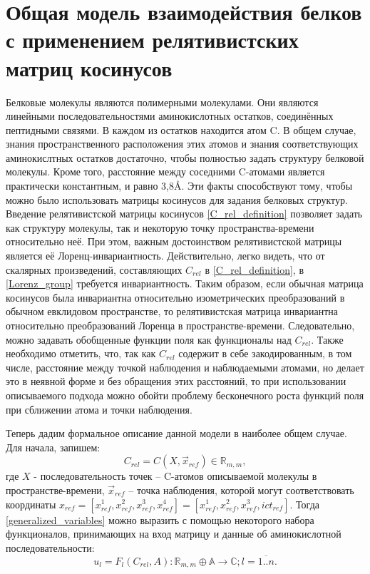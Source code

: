 \section{Общая модель взаимодействия белков с применением релятивистских матриц косинусов}
Белковые молекулы являются полимерными молекулами. Они являются линейными последовательностями аминокислотных остатков, соединённых пептидными связями. В каждом из остатков
находится атом C\textalpha. В общем случае, знания пространственного расположения этих атомов и знания соответствующих аминокислтных остатков достаточно, чтобы полностью задать структуру белковой молекулы.
Кроме того, расстояние между соседними C\textalpha-атомами является практически константным, и равно 3,8\AA. Эти факты способствуют тому, чтобы можно было использовать матрицы косинусов для задания белковых структур.
Введение релятивистской матрицы косинусов \ref{C_rel_definition} позволяет задать как структуру молекулы, так и некоторую точку пространства-времени относительно неё. При этом, важным достоинством релятивистской матрицы является её Лоренц-инвариантность. Действительно, легко видеть, что от скалярных произведений, составляющих $C_{rel}$ в \ref{C_rel_definition}, в \ref{Lorenz_group} требуется инвариантность. Таким образом, если обычная матрица косинусов была инвариантна относительно изометрических преобразований в обычном евклидовом пространстве, то релятивистская матрица инвариантна относительно преобразований Лоренца в пространстве-времени. Следовательно, можно задавать обобщенные функции поля как функционалы над $C_{rel}$. Также необходимо отметить, что, так как $C_{rel}$ содержит в себе закодированным, в том числе, расстояние между точкой наблюдения и наблюдаемыми атомами, но делает это в неявной форме и без обращения этих расстояний, то при использовании описываемого подхода можно обойти проблему бесконечного роста функций поля при сближении атома и точки наблюдения.

Теперь дадим формальное описание данной модели в наиболее общем случае. Для начала, запишем:
\begin{equation}
	C_{rel} = C(X, \vec{x}_{ref}) \in \mathbb{R}_{m,m},
\end{equation}
где $X$ - последовательность точек -- C\textalpha-атомов описываемой молекулы в пространстве-времени, $\vec{x}_{ref}$ -- точка наблюдения, которой могут соответствовать координаты
$x_{ref} = [x_{ref}^1, x_{ref}^2, x_{ref}^3, x_{ref}^4] = [x_{ref}^1, x_{ref}^2, x_{ref}^3, ict_{ref}]$.
Тогда \ref{generalized_variables} можно выразить с помощью некоторого набора функционалов, принимающих на вход матрицу и данные об аминокислотной последовательности:
\begin{equation}
	u_l = F_l(C_{rel}, A) : \mathbb{R}_{m,m} \oplus \mathbb{A} \rightarrow \mathbb{C}; l=\overline{1..n}.
	\label{generalized_variables1}
\end{equation}


